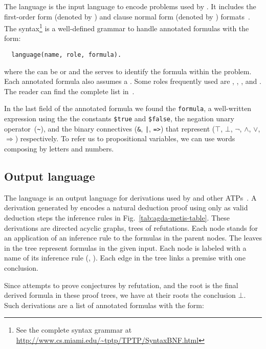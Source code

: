 \documentclass[../main.tex]{subfiles}
\begin{document}
The \TPTP language is the input language to encode problems used by \Metis.
It includes the first-order form (denoted by ) and clause normal
form (denoted by ) formats~\cite{sutcliffe2009}.
The \TPTP syntax\footnote{See the complete syntax grammar
at \url{http://www.cs.miami.edu/~tptp/TPTP/SyntaxBNF.html}} is a
well-defined grammar to handle annotated formulas with the form:
\begin{verbatim}
  language(name, role, formula).
\end{verbatim}
where the  can be  or  and the  serves
to identify the formula within the problem. Each
annotated formula also assumes a . Some roles frequently used are ,
, ,  and . The reader
can find the complete list in~\cite{sutcliffe2009}.

In the last field of the annotated formula we found the \texttt{formula},
a well-written expression using the
the constants \verb!$true! and \verb!$false!, the negation unary
operator~(\verb!~!), and the binary connectives
(\verb!&!, \verb!|!, \verb!=>!) that represent
($⊤$, $⊥$, $¬$, $∧$, $∨$, $⇒$) respectively.
To refer us to propositional variables, we can use words composing by letters and numbers.


\subsection{Output language}
\label{ssec:output-language}

The \TSTP language is an output language for derivations used by
\Metis and other ATPs~\cite{Sutcliffe-Schulz-Claessen-VanGelder-2006}.
A \TSTP  derivation generated by \Metis encodes a natural
deduction proof using only as valid deduction steps the inference rules
in Fig.~\ref{tab:agda-metis-table}.
These derivations are directed acyclic graphs, trees of refutations.
Each node stands for an application of an inference rule to the formulas
in the parent nodes. The leaves in the tree represent formulas in the given
\TPTP input. Each node is labeled with a name of its inference rule (\eg, \canonicalize).
Each edge in the tree links a premise with one conclusion.

Since \Metis attempts to prove conjectures by refutation, and the root
is the final derived formula in these proof trees,  we have at their
roots the conclusion $⊥$. Such derivations are a list of annotated
formulas with the form:
\end{document}
